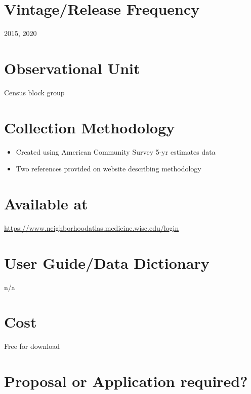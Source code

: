 \documentclass[
]{book}
\providecommand{\tightlist}{%
  \setlength{\itemsep}{0pt}\setlength{\parskip}{0pt}}
\begin{document}
\hypertarget{vintagerelease-frequency-8}{%
\section{Vintage/Release Frequency}\label{vintagerelease-frequency-8}}

2015, 2020

\hypertarget{observational-unit-8}{%
\section{Observational Unit}\label{observational-unit-8}}

Census block group

\hypertarget{collection-methodology-8}{%
\section{Collection Methodology}\label{collection-methodology-8}}

\begin{itemize}
\tightlist
\item
  Created using American Community Survey 5-yr estimates data
\item
  Two references provided on website describing methodology
\end{itemize}

\hypertarget{available-at-8}{%
\section{Available at}\label{available-at-8}}

\url{https://www.neighborhoodatlas.medicine.wisc.edu/login}

\hypertarget{user-guidedata-dictionary-8}{%
\section{User Guide/Data Dictionary}\label{user-guidedata-dictionary-8}}

n/a

\hypertarget{cost-8}{%
\section{Cost}\label{cost-8}}

Free for download

\hypertarget{proposal-or-application-required-8}{%
\section{Proposal or Application required?}\label{proposal-or-application-required-8}}
\end{document}
